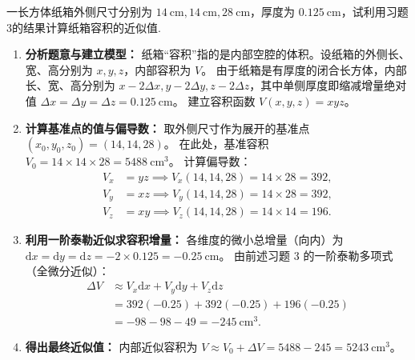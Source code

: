 \documentclass[lang=cn,11pt]{elegantbook}
\begin{document}
\begin{exercise}[纸箱容积近似计算]
一长方体纸箱外侧尺寸分别为 $14\ \mathrm{cm},14\ \mathrm{cm},28\ \mathrm{cm}$，厚度为 $0.125\ \mathrm{cm}$，试利用习题3的结果计算纸箱容积的近似值.
\end{exercise}
\begin{solution}
\begin{enumerate}
  \item \textbf{分析题意与建立模型：}
  纸箱“容积”指的是内部空腔的体积。设纸箱的外侧长、宽、高分别为 $x, y, z$，内部容积为 $V$。
  由于纸箱是有厚度的闭合长方体，内部长、宽、高分别为 $x - 2\Delta x, y - 2\Delta y, z - 2\Delta z$，其中单侧厚度即缩减增量绝对值 $\Delta x = \Delta y = \Delta z = 0.125\ \mathrm{cm}$。
  建立容积函数 $V(x,y,z) = xyz$。
  
  \item \textbf{计算基准点的值与偏导数：}
  取外侧尺寸作为展开的基准点 $(x_0, y_0, z_0) = (14, 14, 28)$。
  在此处，基准容积 $V_0 = 14 \times 14 \times 28 = 5488\ \mathrm{cm}^3$。
  计算偏导数：
  \begin{align*}
  V_x &= yz \implies V_x(14,14,28) = 14 \times 28 = 392, \\
  V_y &= xz \implies V_y(14,14,28) = 14 \times 28 = 392, \\
  V_z &= xy \implies V_z(14,14,28) = 14 \times 14 = 196.
  \end{align*}
  
  \item \textbf{利用一阶泰勒近似求容积增量：}
  各维度的微小总增量（向内）为 $\mathrm{d}x = \mathrm{d}y = \mathrm{d}z = -2 \times 0.125 = -0.25\ \mathrm{cm}$。
  由前述习题 3 的一阶泰勒多项式（全微分近似）：
  \begin{align*}
  \Delta V &\approx V_x \mathrm{d}x + V_y \mathrm{d}y + V_z \mathrm{d}z \\
  &= 392(-0.25) + 392(-0.25) + 196(-0.25) \\
  &= -98 - 98 - 49 = -245\ \mathrm{cm}^3.
  \end{align*}
  
  \item \textbf{得出最终近似值：}
  内部近似容积为 $V \approx V_0 + \Delta V = 5488 - 245 = 5243\ \mathrm{cm}^3$。
\end{enumerate}
\end{solution}

\end{document}
